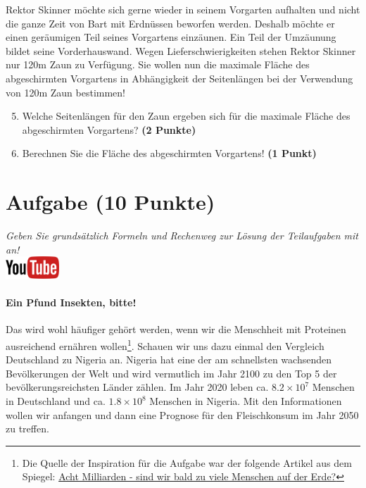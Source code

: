 \documentclass[a4paper, 9pt]{scrartcl}\usepackage[]{graphicx}\usepackage[]{xcolor}
\begin{document}
Rektor Skinner m{\"o}chte sich gerne wieder in seinem Vorgarten aufhalten und
nicht die ganze Zeit von Bart mit Erdn{\"u}ssen beworfen werden. Deshalb m{\"o}chte
er einen ger{\"a}umigen Teil seines Vorgartens einz{\"a}unen. Ein Teil der
Umz{\"a}unung bildet seine Vorderhauswand. Wegen Lieferschwierigkeiten stehen
Rektor Skinner nur 120m Zaun zu Verf{\"u}gung. Sie wollen nun die
maximale Fl{\"a}che des abgeschirmten Vorgartens in Abh{\"a}ngigkeit der
Seitenl{\"a}ngen bei der Verwendung von 120m Zaun bestimmen!

\begin{enumerate}
  \setcounter{enumi}{4}  
\item  Welche Seitenl{\"a}ngen f{\"u}r den Zaun ergeben sich f{\"u}r die
  maximale Fl{\"a}che des abgeschirmten Vorgartens? \textbf{(2 Punkte)}
\item Berechnen Sie die Fl{\"a}che des abgeschirmten Vorgartens! \textbf{(1
    Punkt)}
\end{enumerate}

 
\clearpage

\section{Aufgabe \hfill (10 Punkte)}

\textit{Geben Sie grunds{\"a}tzlich Formeln und Rechenweg zur L{\"o}sung der
  Teilaufgaben mit an!} \\[1Ex]

\hfill\href{https://youtu.be/OhyuH6hzEhY}{\includegraphics[width = 2cm]{img/youtube}} %
\hspace{2Ex}




\paragraph{Ein Pfund Insekten, bitte!} Das wird wohl h{\"a}ufiger geh{\"o}rt
werden, wenn wir die Menschheit mit Proteinen ausreichend ern{\"a}hren
wollen\footnote{Die Quelle der Inspiration f{\"u}r die Aufgabe war der folgende
  Artikel aus dem Spiegel:
  \href{https://www.spiegel.de/ausland/ueberbevoelkerung-acht-milliarden-sind-wir-bald-zu-viele-menschen-auf-der-erde-a-3f20c7bc-3d60-4440-9f52-eb338db207f5}{Acht
    Milliarden - sind wir bald zu viele Menschen auf der Erde?}}. Schauen
wir uns dazu einmal den Vergleich Deutschland zu Nigeria an. Nigeria hat
eine der am schnellsten wachsenden Bev{\"o}lkerungen der Welt und wird
vermutlich im Jahr 2100 zu den Top 5 der bev{\"o}lkerungsreichsten L{\"a}nder
z{\"a}hlen. Im Jahr 2020 leben ca. \ensuremath{8.2\times 10^{7}} Menschen in
Deutschland und ca. \ensuremath{1.8\times 10^{8}} Menschen in Nigeria. Mit den
Informationen wollen wir anfangen und dann eine Prognose f{\"u}r den
Fleischkonsum im Jahr 2050 zu treffen. \\ 
\end{document}
